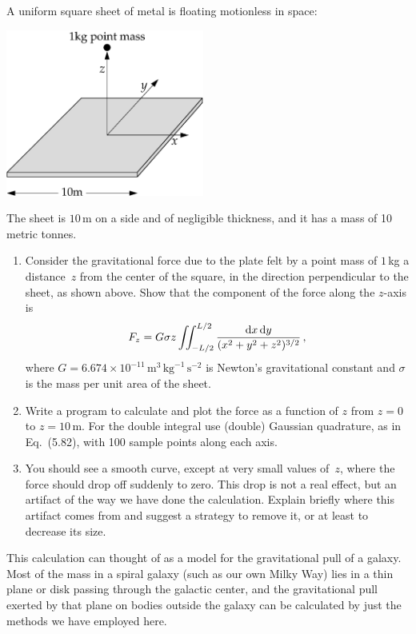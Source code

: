 \documentclass[12pt]{article}
\begin{document}
\begin{exercises}
\exskip A uniform square sheet of metal is floating motionless in space:
\begin{center}
\includegraphics[width=6.5cm]{plate.eps}
\end{center}
The sheet is $10\,$m on a side and of negligible thickness, and it has a
mass of 10 metric tonnes.
\begin{enumerate}\setlength{\itemsep}{0pt}
\item Consider the gravitational force due to the plate felt by a point
  mass of $1\,$kg a distance~$z$ from the center of the square, in the
  direction perpendicular to the sheet, as shown above.  Show that the
  component of the force along the $z$-axis is
\begin{displaymath}
F_z = G\sigma z \iint_{-L/2}^{L/2} {\mathrm{d} x\,\mathrm{d} y\over(x^2+y^2+z^2)^{3/2}}\,,
\end{displaymath}
where
$G=6.674\times10^{-11}\,\mathrm{m}^3\,\mathrm{kg}^{-1}\,\mathrm{s}^{-2}$ is
Newton's gravitational constant and $\sigma$ is the mass per unit area of
the sheet.
\item Write a program to calculate and plot the force as a function of $z$
  from $z=0$ to $z=10\,$m.  For the double integral use (double) Gaussian
  quadrature, as in Eq.~(5.82), with 100 sample points along each axis.
\item You should see a smooth curve, except at very small values of~$z$,
  where the force should drop off suddenly to zero.  This drop is not a
  real effect, but an artifact of the way we have done the calculation.
  Explain briefly where this artifact comes from and suggest a strategy to
  remove it, or at least to decrease its size.
\end{enumerate}
This calculation can thought of as a model for the gravitational pull of a
galaxy.  Most of the mass in a spiral galaxy (such as our own Milky Way)
lies in a thin plane or disk passing through the galactic center, and the
gravitational pull exerted by that plane on bodies outside the galaxy can
be calculated by just the methods we have employed here.



\end{exercises}
\end{document}
